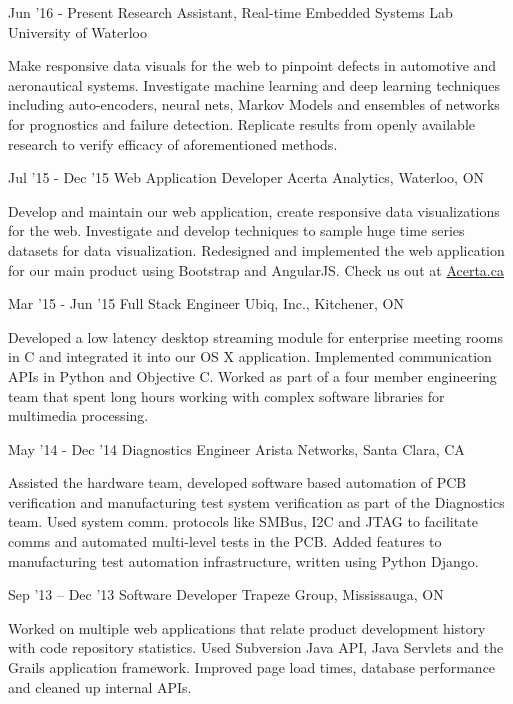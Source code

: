 \documentclass{tccv}
\begin{document}
\begin{eventlist}


\item {Jun '16 - Present}
  {Research Assistant, Real-time Embedded Systems Lab}
  {University of Waterloo}

  Make responsive data visuals for the web to pinpoint defects in automotive and
  aeronautical systems. Investigate machine learning and deep learning
  techniques including auto-encoders, neural nets, Markov Models and ensembles of
  networks for prognostics and failure detection. Replicate results from openly
  available research to verify efficacy of aforementioned methods.

\item{Jul '15 - Dec '15}
  {Web Application Developer}
  {Acerta Analytics, Waterloo, ON}

  Develop and maintain our web application, create responsive data
  visualizations for the web. Investigate and develop techniques to sample huge
  time series datasets for data visualization. Redesigned and implemented the
  web application for our main product using Bootstrap and AngularJS. Check us
  out at \href{http://www.acerta.ca}{Acerta.ca}

\item{Mar '15 - Jun '15}
  {Full Stack Engineer}
  {Ubiq, Inc., Kitchener, ON}

  Developed a low latency desktop streaming module for enterprise meeting rooms
  in C and integrated it into our OS X application. Implemented communication
  APIs in Python and Objective C. Worked as part of a four member engineering
  team that spent long hours working with complex software libraries for
  multimedia processing.

\item{May '14 - Dec '14}
  {Diagnostics Engineer}
  {Arista Networks, Santa Clara, CA}

  Assisted the hardware team, developed software based automation of PCB
  verification and manufacturing test system verification as part of the
  Diagnostics team. Used system comm. protocols like SMBus, I2C and JTAG to
  facilitate comms and automated multi-level tests in the PCB. Added features to
  manufacturing test automation infrastructure, written using Python Django.

\item{Sep '13 -- Dec '13}
  {Software Developer}
  {Trapeze Group, Mississauga, ON}

  Worked on multiple web applications that relate product development history
  with code repository statistics. Used Subversion Java API, Java Servlets and
  the Grails application framework. Improved page load times, database
  performance and cleaned up internal APIs.


\end{eventlist}
\end{document}
